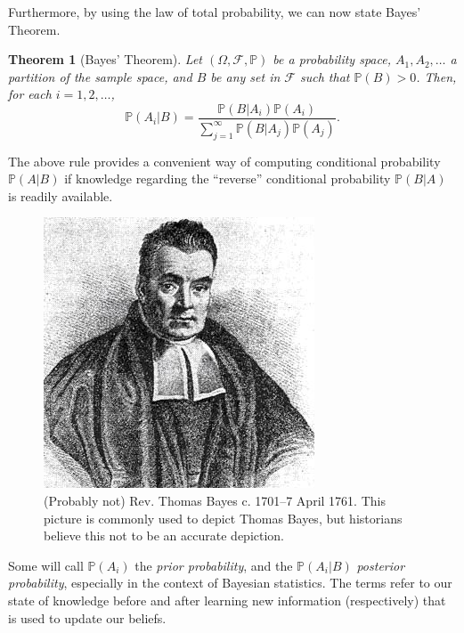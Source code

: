 \documentclass[
]{book}
\newcommand{\bbP}{\mathbb{P}}
\newcommand{\cF}{{\mathcal F}}
\newtheorem{theorem}{Theorem}[chapter]
\theoremstyle{definition}
\theoremstyle{definition}
\theoremstyle{definition}
\theoremstyle{definition}
\theoremstyle{remark}
\begin{document}
Furthermore, by using the law of total probability, we can now state Bayes' Theorem.

\begin{theorem}[Bayes' Theorem]
Let \((\Omega,\cF,\bbP)\) be a probability space, \(A_1,A_2,\dots\) a partition of the sample space, and \(B\) be any set in \(\cF\) such that \(\bbP(B)>0\).
Then, for each \(i=1,2,\dots\),
\[
  \bbP(A_i|B) = \frac{\bbP(B|A_i)\bbP(A_i)}{\sum_{j=1}^\infty \bbP(B|A_j)\bbP(A_j)}.
\]
\end{theorem}

The above rule provides a convenient way of computing conditional probability \(\bbP(A|B)\) if knowledge regarding the ``reverse'' conditional probability \(\bbP(B|A)\) is readily available.

\begin{figure}

{\centering \includegraphics[width=0.5\linewidth]{figure/bayes} 

}

\caption{(Probably not) Rev. Thomas Bayes c. 1701--7 April 1761. This picture is commonly used to depict Thomas Bayes, but historians believe this not to be an accurate depiction.}\label{fig:revthomasbayes}
\end{figure}

Some will call \(\bbP(A_i)\) the \emph{prior probability}, and the \(\bbP(A_i|B)\) \emph{posterior probability}, especially in the context of Bayesian statistics. The terms refer to our state of knowledge before and after learning new information (respectively) that is used to update our beliefs.
\end{document}

